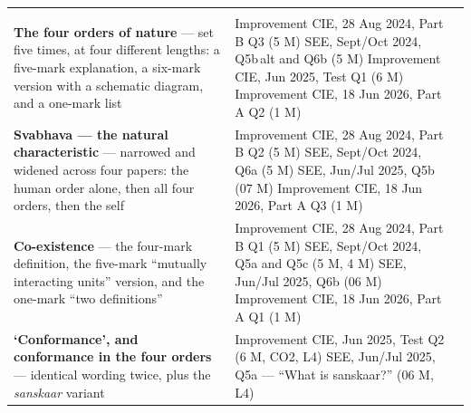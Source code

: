 \renewcommand{\arraystretch}{1.35}
\setlength{\LTpre}{8pt}\setlength{\LTpost}{4pt}
\begin{longtable}{P{58mm} P{80mm} C{14mm}}
 &  &  \\ \hline \endfirsthead
{}
 &  &  \\ \hline \endhead
\textbf{The four orders of nature} --- set five times, at four different
  lengths: a five-mark explanation, a six-mark version with a schematic
  diagram, and a one-mark list &
  Improvement CIE, 28 Aug 2024, Part B Q3 (5 M)\newline
  SEE, Sept/Oct 2024, Q5b\,alt and Q6b (5 M)\newline
  Improvement CIE, Jun 2025, Test Q1 (6 M)\newline
  Improvement CIE, 18 Jun 2026, Part A Q2 (1 M) &
  \newline{}\newline{} \\ \hline
\textbf{Svabhava --- the natural characteristic} --- narrowed and widened
  across four papers: the human order alone, then all four orders, then the
  self &
  Improvement CIE, 28 Aug 2024, Part B Q2 (5 M)\newline
  SEE, Sept/Oct 2024, Q6a (5 M)\newline
  SEE, Jun/Jul 2025, Q5b (07 M)\newline
  Improvement CIE, 18 Jun 2026, Part A Q3 (1 M) &
  \newline{} \\ \hline
\textbf{Co-existence} --- the four-mark definition, the five-mark
  ``mutually interacting units'' version, and the one-mark ``two
  definitions'' &
  Improvement CIE, 28 Aug 2024, Part B Q1 (5 M)\newline
  SEE, Sept/Oct 2024, Q5a and Q5c (5 M, 4 M)\newline
  SEE, Jun/Jul 2025, Q6b (06 M)\newline
  Improvement CIE, 18 Jun 2026, Part A Q1 (1 M) &
  \newline{}\newline{} \\ \hline
\textbf{`Conformance', and conformance in the four orders} --- identical
  wording twice, plus the \emph{sanskaar} variant &
  Improvement CIE, Jun 2025, Test Q2 (6 M, CO2, L4)\newline
  SEE, Jun/Jul 2025, Q5a --- ``What is sanskaar?'' (06 M, L4)\newline

\end{longtable}
